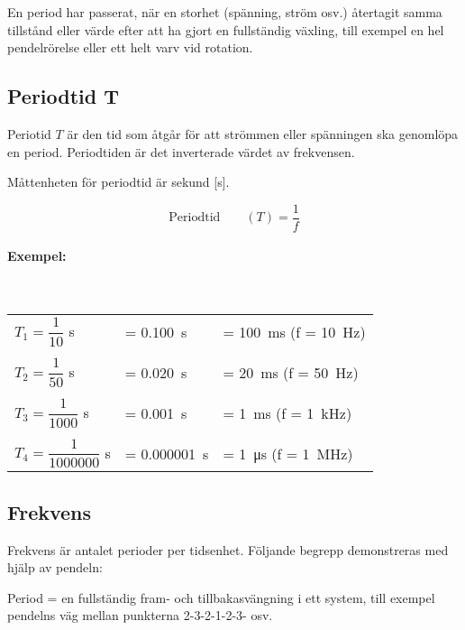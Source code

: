 En period har passerat, när en storhet (spänning, ström osv.) återtagit samma
tillstånd eller värde efter att ha gjort en fullständig växling, till exempel en hel
pendelrörelse eller ett helt varv vid rotation.

\newpage
\subsection{Periodtid T}

Periotid \(T\) är den tid som åtgår för att strömmen eller spänningen ska
genomlöpa en period. Periodtiden är det inverterade värdet av frekvensen.

Måttenheten för periodtid är sekund [s].

$$\text{Periodtid} \qquad (T) = \dfrac{1}{f}$$

\noindent

\paragraph{Exempel:}~\\[1ex]
\begin{small}
\begin{tabular}{@{}lll}
\(T_1=\dfrac{1}{10}\) s & = \SI{0,100}{\second} & = \SI{100}{\milli\second} (f = \SI{10}{\hertz})\\
\\
\(T_2=\dfrac{1}{50}\) s & = \SI{0,020}{\second} & = \SI{20}{\milli\second} (f = \SI{50}{\hertz})\\
\\
\(T_3=\dfrac{1}{1000}\) s & = \SI{0,001}{\second} & = \SI{1}{\milli\second} (f = \SI{1}{\kilo\hertz})\\
\\
\(T_4=\dfrac{1}{1000000}\) s & = \SI{0,000001}{\second} & = \SI{1}{\micro\second} (f = \SI{1}{\mega\hertz})\\
\end{tabular}
\end{small}

\subsection{Frekvens}

Frekvens är antalet perioder per tidsenhet.
Följande begrepp demonstreras med hjälp av pendeln:

Period = en fullständig fram- och tillbakasvängning i ett system, till exempel
pendelns väg mellan punkterna 2-3-2-1-2-3- osv.

